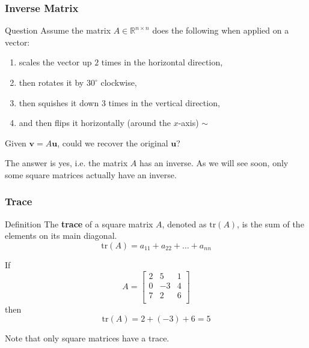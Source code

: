 \documentclass{beamer}
\newcommand{\R}{\mathbb{R}}
\begin{document}
\begin{frame}
  \frametitle{Inverse Matrix}

\begin{block}{Question}
    Assume the matrix $A \in \R^{n \times n}$ does the following when applied on a vector:

    \begin{enumerate}
        \item scales the vector up $2$ times in the horizontal direction, 
        \item then rotates it by $30^\circ$ clockwise,
        \item then squishes it down $3$ times in the vertical direction,
        \item and then flips it horizontally (around the $x$-axis) $\sim$
    \end{enumerate}

\pause

Given $\mathbf{v}=A\mathbf{u}$, could we recover the original $\mathbf{u}$?
    
\end{block}

\pause

The answer is yes, i.e. the matrix $A$ has an inverse. As we will see soon, only some square matrices actually have an inverse.

\end{frame}


\begin{frame}
  \frametitle{Trace }

  \begin{block}{Definition}
    The \textbf{trace} of a square matrix \(A\), denoted as \(\text{tr}(A)\), is the sum of the elements on its main diagonal.
    \[
      \text{tr}(A) = a_{11} + a_{22} + \ldots + a_{nn}
    \]
  \end{block}

  \pause

  \begin{example}
    If
    \[
      A = \begin{bmatrix}
        2 & 5 & 1 \\
        0 & -3 & 4 \\
        7 & 2 & 6 \\
      \end{bmatrix}
    \]
    then
    \[
      \text{tr}(A) = 2 + (-3) + 6 = 5
    \]
  \end{example}
\pause Note that only square matrices have a trace. 
\end{frame}
\end{document}
